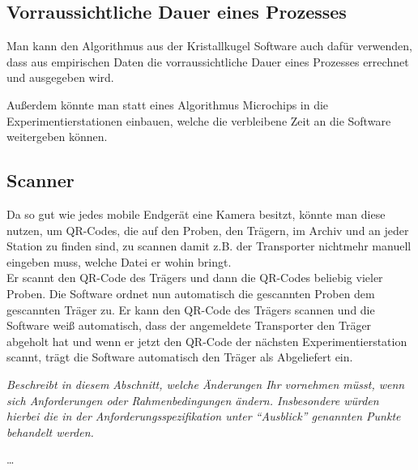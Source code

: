 \documentclass[enabledeprecatedfontcommands,fontsize=12pt,paper=a4,twoside]{scrartcl}
\begin{document}
\subsection{Vorraussichtliche Dauer eines Prozesses}
{
Man kann den Algorithmus aus der Kristallkugel Software auch dafür verwenden, dass aus empirischen Daten die vorraussichtliche Dauer eines Prozesses errechnet und ausgegeben wird. 

Außerdem könnte man statt eines Algorithmus Microchips in die Experimentierstationen einbauen, welche die verbleibene Zeit an die Software weitergeben können. 
}
\subsection{Scanner}
{
Da so gut wie jedes mobile Endgerät eine Kamera besitzt, könnte man diese nutzen, um QR-Codes, die auf den Proben, den Trägern, im Archiv und an jeder Station zu finden sind, zu scannen damit z.B. der Transporter nichtmehr manuell eingeben muss, welche Datei er wohin bringt. \\
Er scannt den QR-Code des Trägers und dann die QR-Codes beliebig vieler Proben. Die Software ordnet nun automatisch die gescannten Proben dem gescannten Träger zu. 
Er kann den QR-Code des Trägers scannen und die Software weiß automatisch, dass der angemeldete Transporter den Träger abgeholt hat und wenn er jetzt den QR-Code der nächsten Experimentierstation scannt, trägt die Software automatisch den Träger als Abgeliefert ein. 
}

{\it
  Beschreibt in diesem Abschnitt, welche Änderungen Ihr
  vornehmen müsst, wenn sich Anforderungen oder Rahmenbedingungen
  ändern. Insbesondere würden hierbei die in der
  Anforderungsspezifikation unter "`Ausblick"' genannten
  Punkte behandelt werden.}

\dots
\end{document}
